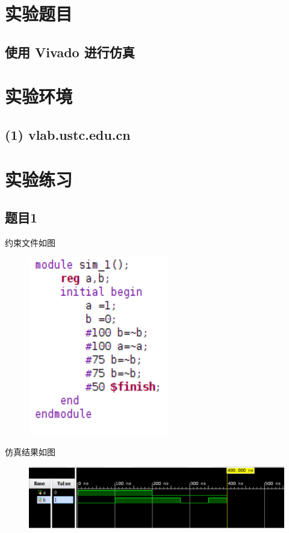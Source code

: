 \documentclass{article}
\begin{document}
    \section{实验题目}
        \subsection*{\qquad 使用 Vivado 进行仿真}
        
    \section{实验环境}
        \subsection*{\qquad (1) vlab.ustc.edu.cn}
    
    \vspace*{3cm}
    \section{实验练习}
    \subsection*{题目1} 约束文件如图
    \begin{figure}[htbp]
        \centering
        \includegraphics[scale=1.5]{t1s.png}
    \end{figure}

    仿真结果如图
    \begin{figure}[htbp]
        \centering
        \includegraphics[scale=0.8]{t1.png}
    \end{figure}
\end{document}
